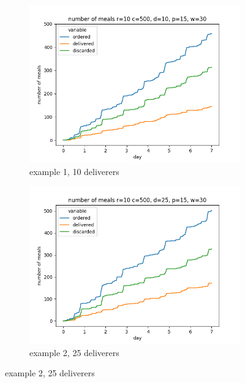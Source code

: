 \begin{center}
    \begin{figure}
        \centering
        \begin{subfigure}[m]{0.30\textwidth}
            \centering
            \includegraphics[width=\textwidth]{sections/run1/week_ed_food_ordering_distribution_500_10_10_30}
            \caption{example 1, 10 deliverers}
        \end{subfigure}
        \hfill
        \begin{subfigure}[m]{0.30\textwidth}
            \centering
            \includegraphics[width=\textwidth]{sections/run1/week_ed_food_ordering_distribution_500_10_25_30}
            \caption{example 2, 25 deliverers}

\end{subfigure}
\end{figure}
\end{center}
